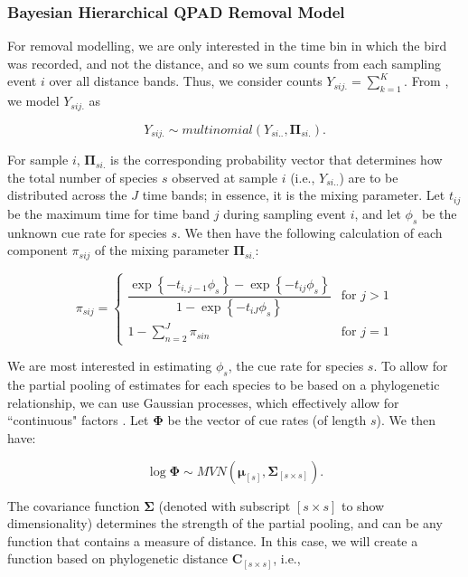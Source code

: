 \documentclass[12pt]{article}
\begin{document}
\subsubsection{Bayesian Hierarchical QPAD Removal Model}

\par For removal modelling, we are only interested in the time bin in which the bird was recorded, and not the distance, and so we sum counts from each sampling event $i$ over all distance bands. 
Thus, we consider counts $Y_{sij.} = \sum_{k=1}^{K}$. 
From \citet{solymos_calibrating_2013}, we model $Y_{sij.}$ as

$$Y_{sij.} \sim multinomial\left(Y_{si..}, \mathbf{\Pi}_{si.}\right).$$

\par For sample $i$, $\mathbf{\Pi}_{si.}$ is the corresponding probability vector that determines how the total number of species $s$ observed at sample $i$ (i.e., $Y_{si..}$) are to be distributed across the $J$ time bands; in essence, it is the mixing parameter.
Let $t_{ij}$ be the maximum time for time band $j$ during sampling event $i$, and let $\phi_s$ be the unknown cue rate for species $s$.
We then have the following calculation of each component $\pi_{sij}$ of the mixing parameter $\mathbf{\Pi}_{si.}$:

\begin{equation*}
	\pi_{sij} = 
	\begin{cases}
		\dfrac{\exp\left\{ -t_{i,j-1}\phi_{s} \right\} - \exp\left\{ -t_{ij}\phi_{s} \right\}}{1 - \exp\left\{ -t_{iJ}\phi_{s} \right\}} & \text{for } j > 1 \\
		1 - \sum_{n = 2}^{J} \pi_{sin} & \text{for } j = 1
	\end{cases}
\end{equation*}

\par We are most interested in estimating $\phi_s$, the cue rate for species $s$. 
To allow for the partial pooling of estimates for each species to be based on a phylogenetic relationship, we can use Gaussian processes, which effectively allow for ``continuous" factors \citep{bernardo_regression_1998, mcelreath_continous_2020}. 
Let $\mathbf{\Phi}$ be the vector of cue rates (of length $s$). 
We then have:

$$\log \mathbf{\Phi} \sim MVN\left( \mathbf{\mu}_{[s]}, \mathbf{\Sigma}_{[s \times s]} \right).$$

\par The covariance function $\mathbf{\Sigma}$ (denoted with subscript $[s \times s]$ to show dimensionality) determines the strength of the partial pooling, and can be any function that contains a measure of distance. 
In this case, we will create a function based on phylogenetic distance $\mathbf{C}_{[s \times s]}$, i.e.,
\end{document}
